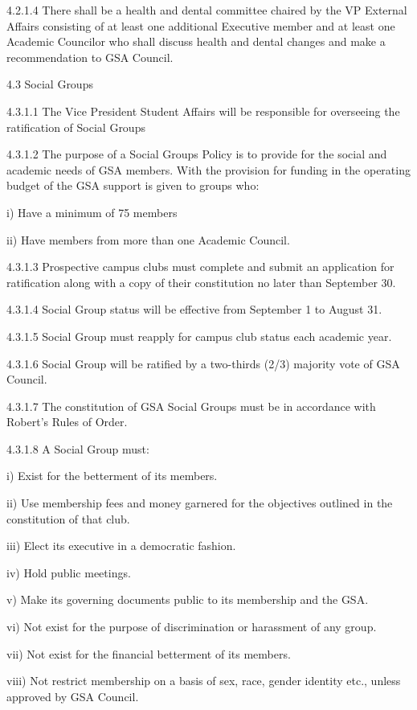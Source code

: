  4.2.1.4 There shall be a health and dental committee chaired by the VP External Affairs consisting of at least one additional Executive member and at least one Academic Councilor who shall discuss health and dental changes and make a recommendation to GSA Council. 
  
 4.3 Social Groups 
 
 4.3.1.1 The Vice President Student Affairs will be responsible for overseeing the ratification of Social Groups 
 
 4.3.1.2 The purpose of a Social Groups Policy is to provide for the social and academic needs of GSA members. With the provision for funding in the operating budget of the GSA support is given to groups who: 
 
 i) Have a minimum of 75%
 members 
 
 ii) Have members from more than one Academic Council. 
 
 4.3.1.3 Prospective campus clubs must complete and submit an application for ratification along with a copy of their constitution no later than September 30. 
 
 4.3.1.4 Social Group status will be effective from September 1 to August 31. 
 
 4.3.1.5 Social Group must reapply for campus club status each academic year. 
 
 4.3.1.6 Social Group will be ratified by a two-thirds (2/3) majority vote of GSA Council. 
 
 4.3.1.7 The constitution of GSA Social Groups must be in accordance with Robert’s Rules of Order. 
 
 4.3.1.8 A Social Group must: 
 
 i) Exist for the betterment of its members. 
 
 ii) Use membership fees and money garnered for the objectives outlined in the constitution of that club. 
 
 iii) Elect its executive in a democratic fashion. 
 
 iv) Hold public meetings. 
 
 v) Make its governing documents public to its membership and the GSA. 
 
 vi) Not exist for the purpose of discrimination or harassment of any group. 
 
 vii) Not exist for the financial betterment of its members. 
 
 viii) Not restrict membership on a basis of sex, race, gender identity etc., unless approved by GSA Council. 
 
